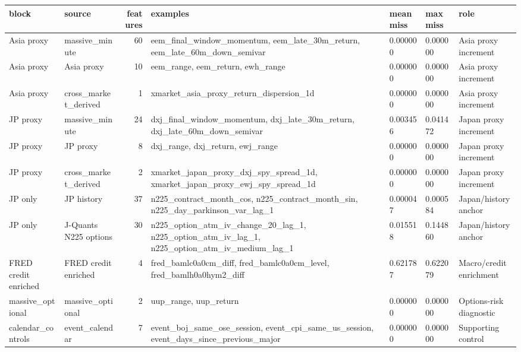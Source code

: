 \begin{tabular}{llrllll}
\toprule
block & source & features & examples & mean miss & max miss & role \\
\midrule
Asia proxy & massive\_minute & 60 & eem\_final\_window\_momentum, eem\_late\_30m\_return, eem\_late\_60m\_down\_semivar & 0.000000 & 0.000000 & Asia proxy increment \\
Asia proxy & Asia proxy & 10 & eem\_range, eem\_return, ewh\_range & 0.000000 & 0.000000 & Asia proxy increment \\
Asia proxy & cross\_market\_derived & 1 & xmarket\_asia\_proxy\_return\_dispersion\_1d & 0.000000 & 0.000000 & Asia proxy increment \\
JP proxy & massive\_minute & 24 & dxj\_final\_window\_momentum, dxj\_late\_30m\_return, dxj\_late\_60m\_down\_semivar & 0.003456 & 0.041472 & Japan proxy increment \\
JP proxy & JP proxy & 8 & dxj\_range, dxj\_return, ewj\_range & 0.000000 & 0.000000 & Japan proxy increment \\
JP proxy & cross\_market\_derived & 2 & xmarket\_japan\_proxy\_dxj\_spy\_spread\_1d, xmarket\_japan\_proxy\_ewj\_spy\_spread\_1d & 0.000000 & 0.000000 & Japan proxy increment \\
JP only & JP history & 37 & n225\_contract\_month\_cos, n225\_contract\_month\_sin, n225\_day\_parkinson\_var\_lag\_1 & 0.000047 & 0.000584 & Japan/history anchor \\
JP only & J-Quants N225 options & 30 & n225\_option\_atm\_iv\_change\_20\_lag\_1, n225\_option\_atm\_iv\_lag\_1, n225\_option\_atm\_iv\_medium\_lag\_1 & 0.015518 & 0.144860 & Japan/history anchor \\
FRED credit enriched & FRED credit enriched & 4 & fred\_bamlc0a0cm\_diff, fred\_bamlc0a0cm\_level, fred\_bamlh0a0hym2\_diff & 0.621787 & 0.622079 & Macro/credit enrichment \\
massive\_optional & massive\_optional & 2 & uup\_range, uup\_return & 0.000000 & 0.000000 & Options-risk diagnostic \\
calendar\_controls & event\_calendar & 7 & event\_boj\_same\_ose\_session, event\_cpi\_same\_us\_session, event\_days\_since\_previous\_major & 0.000000 & 0.000000 & Supporting control \\

\end{tabular}

